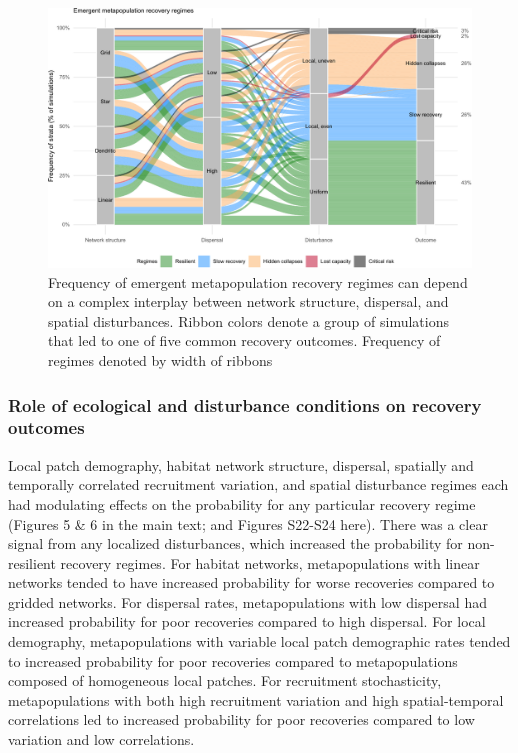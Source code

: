 \documentclass[
]{article}
\begin{document}
\begin{figure}[H]

{\centering \includegraphics{Managing_for_ecological_surprises_in_metapopulations_files/figure-latex/cluster results-1} 

}

\caption{Frequency of emergent metapopulation recovery regimes can depend on a complex interplay between network structure, dispersal, and spatial disturbances. Ribbon colors denote a group of simulations that led to one of five common recovery outcomes. Frequency of regimes denoted by width of ribbons}\label{fig:cluster results}
\end{figure}

\hypertarget{role-of-ecological-and-disturbance-conditions-on-recovery-outcomes}{%
\subsubsection{Role of ecological and disturbance conditions on recovery
outcomes}\label{role-of-ecological-and-disturbance-conditions-on-recovery-outcomes}}

Local patch demography, habitat network structure, dispersal, spatially
and temporally correlated recruitment variation, and spatial disturbance
regimes each had modulating effects on the probability for any
particular recovery regime (Figures 5 \& 6 in the main text; and Figures
S22-S24 here). There was a clear signal from any localized disturbances,
which increased the probability for non-resilient recovery regimes. For
habitat networks, metapopulations with linear networks tended to have
increased probability for worse recoveries compared to gridded networks.
For dispersal rates, metapopulations with low dispersal had increased
probability for poor recoveries compared to high dispersal. For local
demography, metapopulations with variable local patch demographic rates
tended to increased probability for poor recoveries compared to
metapopulations composed of homogeneous local patches. For recruitment
stochasticity, metapopulations with both high recruitment variation and
high spatial-temporal correlations led to increased probability for poor
recoveries compared to low variation and low correlations.
\end{document}
